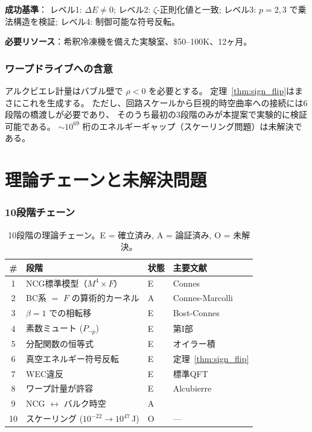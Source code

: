 \documentclass[11pt,a4paper]{article}
\begin{document}
\textbf{成功基準}：
レベル1: $\Delta E \neq 0$;
レベル2: $\zeta$-正則化値と一致;
レベル3: $p=2,3$ で乗法構造を検証;
レベル4: 制御可能な符号反転。

\textbf{必要リソース}：希釈冷凍機を備えた実験室、\$50--100K、12ヶ月。

\section{ワープドライブへの含意}

アルクビエレ計量はバブル壁で $\rho < 0$ を必要とする。
定理~\ref{thm:sign_flip}はまさにこれを生成する。
ただし、回路スケールから巨視的時空曲率への接続には6段階の橋渡しが必要であり、
そのうち最初の3段階のみが本提案で実験的に検証可能である。
$\sim 10^{69}$ 桁のエネルギーギャップ（スケーリング問題）は未解決である。

\newpage
\part{理論チェーンと未解決問題}
\label{part:chain}

\section{10段階チェーン}

\begin{table}[h]
\centering
\caption{10段階の理論チェーン。E = 確立済み, A = 論証済み, O = 未解決。}
\label{tab:chain}
\small
\begin{tabular}{@{}clll@{}}
\toprule
\# & 段階 & 状態 & 主要文献 \\
\midrule
1 & NCG標準模型（$M^4 \times F$） & E & Connes~\cite{Connes1996} \\
2 & BC系 $=$ $F$ の算術的カーネル & A & Connes-Marcolli~\cite{ConnesMarcolli2006} \\
3 & $\beta = 1$ での相転移 & E & Bost-Connes~\cite{BostConnes1995} \\
4 & 素数ミュート ($P_{\neg p}$) & E & 第I部 \\
5 & 分配関数の恒等式 & E & オイラー積 \\
6 & 真空エネルギー符号反転 & E & 定理~\ref{thm:sign_flip} \\
7 & WEC違反 & E & 標準QFT \\
8 & ワープ計量が許容 & E & Alcubierre~\cite{Alcubierre1994} \\
9 & NCG $\leftrightarrow$ バルク時空 & A & \cite{ConnesMarcolli2006,Maldacena1998} \\
10 & スケーリング ($10^{-22}\to 10^{47}\,$J) & O & --- \\
\bottomrule
\end{tabular}
\end{table}
\end{document}
